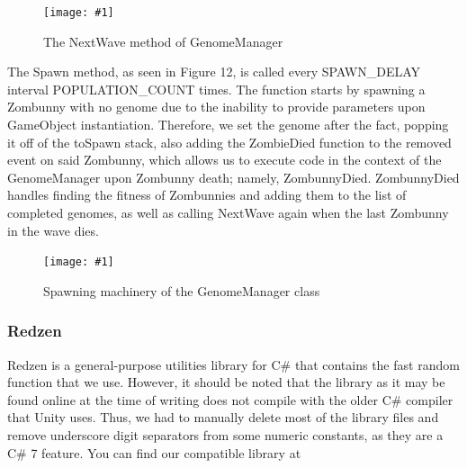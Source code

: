 \documentclass[letterpaper]{article}
\def\imfig#1#2{\begin{figure}[h] \centering \texttt{[image: \#1]} \caption{#2} \end{figure}}
\begin{document}
\imfig{GenomeManagerNextWave}{The NextWave method of GenomeManager}

The Spawn method, as seen in Figure 12, is called every SPAWN\_DELAY interval POPULATION\_COUNT times. The function starts by spawning a Zombunny with no genome due to the inability to provide parameters upon GameObject instantiation. Therefore, we set the genome after the fact, popping it off of the toSpawn stack, also adding the ZombieDied function to the removed event on said Zombunny, which allows us to execute code in the context of the GenomeManager upon Zombunny death; namely, ZombunnyDied. ZombunnyDied handles finding the fitness of Zombunnies and adding them to the list of completed genomes, as well as calling NextWave again when the last Zombunny in the wave dies.

\imfig{GenomeManagerSpawn}{Spawning machinery of the GenomeManager class}



\subsubsection{Redzen}
Redzen is a general-purpose utilities library for C\# that contains the fast random function that we use. However, it should be noted that the library as it may be found online at the time of writing does not compile with the older C\# compiler that Unity uses. Thus, we had to manually delete most of the library files and remove underscore digit separators from some numeric constants, as they are a C\# 7 feature. You can find our compatible library at 

\subsubsection{}
\end{document}
